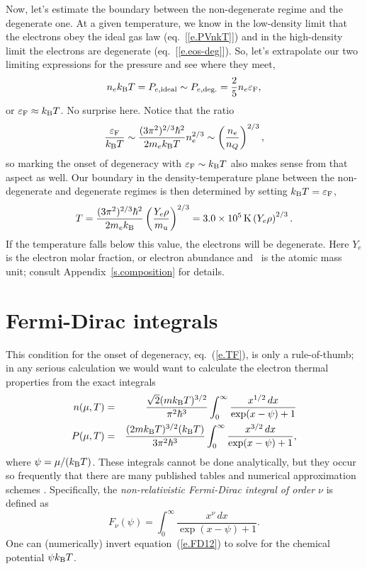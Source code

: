 Now, let's estimate the boundary between the non-degenerate regime and the degenerate one. At a given temperature, we know in the low-density limit that the electrons obey the ideal gas law (eq.~[\ref{e.PVnkT}]) and in the high-density limit the electrons are degenerate (eq.~[\ref{e.eos-deg}]). So, let's extrapolate our two limiting expressions for the pressure and see where they meet,
\begin{equation}
n_{e}k_\mathrm{B} T = P_{e,\mathrm{ideal}} \sim P_{e,\mathrm{deg.}} 
  = \frac{2}{5}n_{e}\varepsilon_{\mathrm{F}},
\end{equation}
or $\varepsilon_{\mathrm{F}} \approx k_\mathrm{B} T$.  No surprise here.  Notice that the ratio
\begin{equation}
\frac{\varepsilon_{\mathrm{F}}}{k_\mathrm{B} T} \sim \frac{(3\pi^{2})^{2/3}\hbar^{2}}{2m_{e}k_\mathrm{B} T}n_{e}^{2/3} \sim \left(\frac{n_{e}}{n_{Q}}\right)^{2/3},
\end{equation}
so marking the onset of degeneracy with $\varepsilon_{\mathrm{F}}\sim k_\mathrm{B} T$ also makes sense from that aspect as well. Our boundary in the density-temperature plane between the non-degenerate and degenerate regimes is then determined by setting $k_\mathrm{B} T = \varepsilon_{\mathrm{F}}$,
\begin{equation}\label{e.TF}
T = \frac{(3\pi^{2})^{2/3}\hbar^{2}}{2m_{e}k_\mathrm{B} }\left(\frac{Y_{e}\rho}{m_\mathrm{u}}\right)^{2/3} = 3.0\times 10^{5}\,\mathrm{K} \left(Y_{e}\rho\right)^{2/3}.
\end{equation}
If the temperature falls below this value, the electrons will be degenerate. Here $Y_{e}$ is the electron molar fraction, or electron abundance and \mb\ is the atomic mass unit; consult Appendix~\ref{s.composition} for details.

\section{Fermi-Dirac integrals}
This condition for the onset of degeneracy, eq.~(\ref{e.TF}), is only a rule-of-thumb; in any serious calculation we would want to calculate the electron thermal properties from the exact integrals
\begin{eqnarray}\label{e.FD12}
n(\mu,T) &=& \frac{\sqrt{2}(mk_\mathrm{B} T)^{3/2}}{\pi^{2}\hbar^{3}}\int_{0}^{\infty} \frac{x^{1/2}\,dx}{\exp(x-\psi)+1} \\
P(\mu,T) &=& \frac{(2mk_\mathrm{B} T)^{3/2}(k_\mathrm{B} T)}{3\pi^{2}\hbar^{3}}\int_{0}^{\infty} \frac{x^{3/2}\,dx}{\exp(x-\psi)+1},
\end{eqnarray}
where $\psi = \mu/(k_\mathrm{B} T)$.  These integrals cannot be done analytically, but they occur so frequently that there are many published tables and numerical approximation schemes \citep[see][]{timmes.swesty:accuracy}.  Specifically, the \emph{non-relativistic Fermi-Dirac integral of order $\nu$} is defined as
\begin{equation}\label{e.FDintegral}
F_{\nu}(\psi) = \int_{0}^{\infty}\frac{ x^{\nu}\,dx}{\exp(x-\psi)+1}.
\end{equation}
One can (numerically) invert equation~(\ref{e.FD12}) to solve for the chemical potential $\psi k_\mathrm{B} T$.

